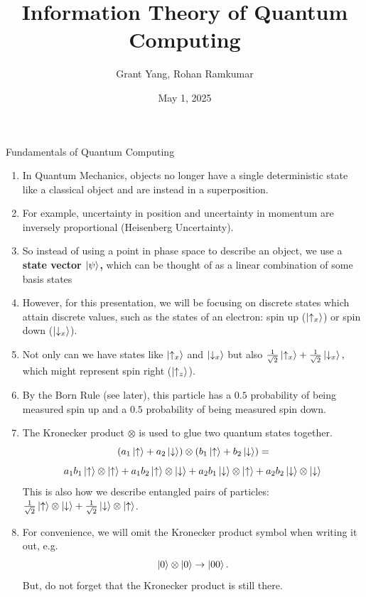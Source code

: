 \documentclass{beamer}
\title{Information Theory of Quantum Computing}
\author{Grant Yang, Rohan Ramkumar}
\date{May 1, 2025}
\begin{document}
\begin{frame}
\maketitle
\end{frame}
\begin{frame}[allowframebreaks]{Fundamentals of Quantum Computing}
\begin{enumerate}
    \item In Quantum Mechanics, objects no longer have a single deterministic state like a classical object and are instead in a superposition.
    \item For example, uncertainty in position and uncertainty in momentum are inversely proportional (Heisenberg Uncertainty).
    \item So instead of using a point in phase space to describe an object, we use a \textbf{state vector $\ket{\psi}$,} which can be thought of as a linear combination of some basis states
    \item However, for this presentation, we will be focusing on discrete states which attain discrete values, such as the states of an electron: spin up ($\ket{\uparrow_x}$) or spin down ($\ket{\downarrow_x}$).
    \item Not only can we have states like $\ket{\uparrow_x}$ and $\ket{\downarrow_x}$ but also $\frac{1}{\sqrt{2}}\ket{\uparrow_x}+\frac{1}{\sqrt{2}}\ket{\downarrow_x},$ which might represent spin right ($\ket{\uparrow_{z}}$).
    \item By the Born Rule (see later), this particle has a $0.5$ probability of being measured spin up and a $0.5$ probability of being measured spin down.

    \item The Kronecker product $\otimes$ is used to glue two quantum states together.
    \[
    (a_1 \ket{\uparrow}+a_2\ket{\downarrow})\otimes(b_1 \ket{\uparrow}+b_2\ket{\downarrow}) =\]
    \[a_1 b_1 \ket{\uparrow}\otimes\ket{\uparrow}+a_1 b_2 \ket{\uparrow}\otimes\ket{\downarrow} + a_2 b_1 \ket \downarrow \otimes \ket \uparrow + a_2 b_2 \ket \downarrow \otimes \ket \downarrow \]
    This is also how we describe entangled pairs of particles: $\frac{1}{\sqrt 2}\ket{\uparrow}\otimes\ket \downarrow + \frac{1}{\sqrt 2} \ket \downarrow \otimes \ket \uparrow$.
    \item For convenience, we will omit the Kronecker product symbol when writing it out, e.g.
    \[\ket{0}\otimes\ket{0}\to\ket{00}.\] But, do not forget that the Kronecker product is still there.
\end{enumerate}
\end{frame}
\end{document}
